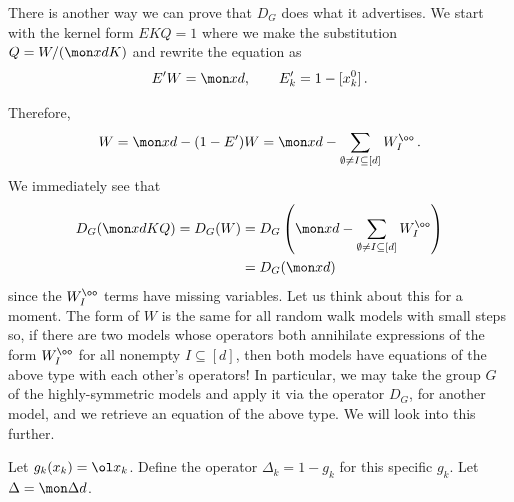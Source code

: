 \begin{example}There is another way we can prove that $D_G$ does what it advertises. We start with the kernel form $EKQ = 1$ where we make the substitution $Q = W/(\mon xd K)$ and rewrite the equation as
\begin{align}
	E' W = \mon xd,\quad\quad E_k' = 1 - [x_k^0]\,.
\end{align}
\end{example}
Therefore,
\begin{align}
	W = \mon xd -(1-E')W=\mon xd - \sum_{\emptyset \neq I \subseteq [d]}W_I^\oo\,.
\end{align}
We immediately see that
\begin{align}\begin{split}
	D_G(\mon xd KQ) = D_G(W) &= D_G\left(\mon xd - \sum_{\emptyset \neq I \subseteq [d]}W_I^\oo\right) \\&= D_G(\mon xd)
\end{split}\end{align}
since the $W_I^\oo$ terms have missing variables. Let us think about this for a moment. The form of $W$ is the same for all random walk models with small steps so, if there are two models whose operators both annihilate expressions of the form $W_I^\oo$ for all nonempty $I\subseteq [d]$, then both models have equations of the above type with each other's operators! In particular, we may take the group $G$ of the highly-symmetric models and apply it via the operator $D_G$, for another model, and we retrieve an equation of the above type. We will look into this further.
\begin{definition} Let $g_k(x_k) = \ol x_k$. Define the operator $\Delta_k = 1 - g_k$ for this specific $g_k$. Let $\Delta = \mon \Delta d$.
\end{definition}

